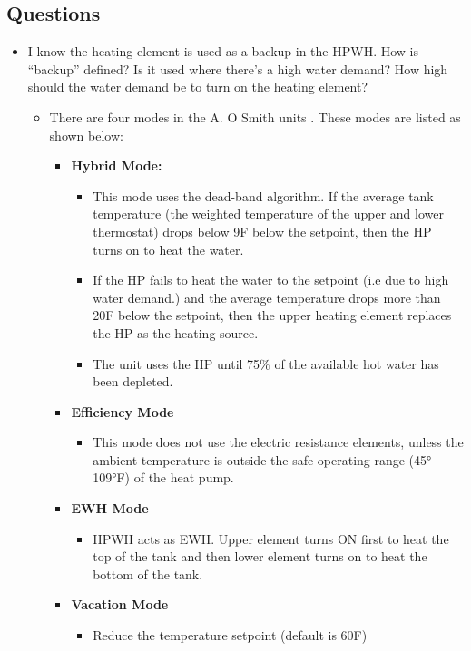\subsection{Questions}
\begin{itemize}
    \item I know the heating element is used as a backup in the HPWH. How is “backup” defined? Is it used where there’s a high water demand? How high should the water demand be to turn on the heating element?
    \begin{itemize}
        \item There are four modes in the A. O Smith units \cite{r1}. These modes are listed as shown below:
        \begin{itemize}
            \item \textbf{Hybrid Mode:}
            \begin{itemize}
                \item This mode uses the dead-band algorithm. If the average tank temperature (the weighted temperature of the upper and lower thermostat) drops below 9F below the setpoint, then the HP turns on to heat the water.
                \item If the HP fails to heat the water to the setpoint (i.e due to high water demand.) and the average temperature drops more than 20F below the setpoint, then the upper heating element replaces the HP as the heating source. 
                \item The unit uses the HP until 75$\%$ of the available hot water has been depleted. 
            \end{itemize}
            \item \textbf{Efficiency Mode}
            \begin{itemize}
                \item This mode does not use the electric resistance elements, unless the ambient temperature is outside the safe operating range (45°–109°F) of the heat pump.
            \end{itemize}
            \item \textbf{EWH Mode}
            \begin{itemize}
                \item HPWH acts as EWH. Upper element turns ON first to heat the top of the tank and then lower element turns on to heat the bottom of the tank.
            \end{itemize}
            \item \textbf{Vacation Mode}
            \begin{itemize}
                \item Reduce the temperature setpoint (default is 60F)
            \end{itemize}
        \end{itemize}
    \end{itemize}
\end{itemize}
